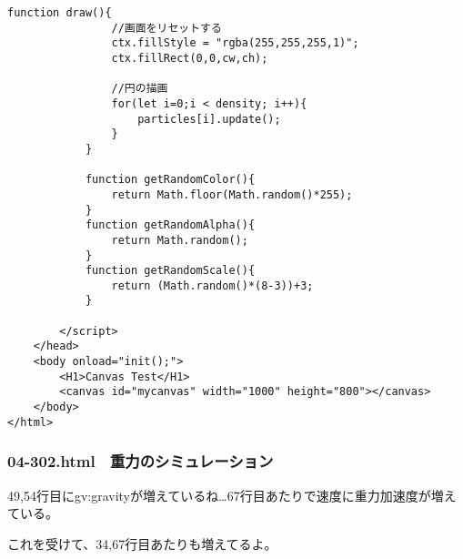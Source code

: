 \documentclass[mingoth,11pt,a4j,uplatex]{jsarticle}
\begin{document}
\begin{lstlisting}[caption=一定の方向に等加速度運動]
			function draw(){
				//画面をリセットする
				ctx.fillStyle = "rgba(255,255,255,1)";
				ctx.fillRect(0,0,cw,ch);
				
				//円の描画
				for(let i=0;i < density; i++){
					particles[i].update();
				}
			}

			function getRandomColor(){
				return Math.floor(Math.random()*255);
			}
			function getRandomAlpha(){
				return Math.random();
			}
			function getRandomScale(){
				return (Math.random()*(8-3))+3;
			}
			
		</script>
	</head>
	<body onload="init();">
		<H1>Canvas Test</H1>
		<canvas id="mycanvas" width="1000" height="800"></canvas>
	</body>
</html>
\end{lstlisting}

\subsubsection{04-302.html　重力のシミュレーション}
49,54行目にgv:gravityが増えているね…67行目あたりで速度に重力加速度が増えている。

これを受けて、34,67行目あたりも増えてるよ。
\end{document}
